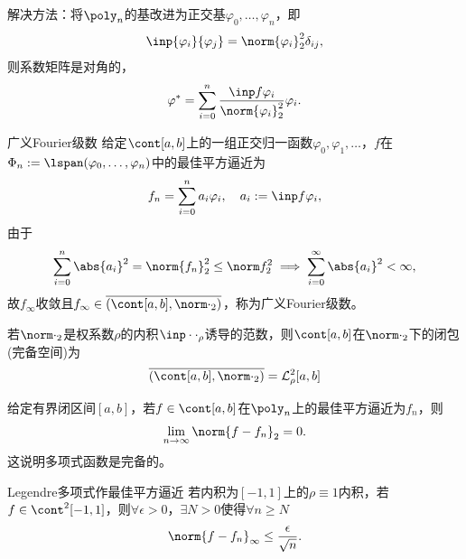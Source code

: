 \begin{remark}
    解决方法：将$\poly_n$的基改进为正交基$\varphi_0,\ldots,\varphi_n$，即
    \[
        \inp{\varphi_i}{\varphi_j}=\norm{\varphi_i}_2^2\delta_{ij},
    \]
    则系数矩阵是对角的，
    \begin{equation}
        \varphi^*=\sum_{i=0}^n\frac{\inp f{\varphi_i}}{\norm{\varphi_i}_2^2}\varphi_i.
    \end{equation}
\end{remark}

\begin{definition}
    {广义Fourier级数}{}
    给定$\cont[a,b]$上的一组正交归一函数$\varphi_0,\varphi_1,\ldots$，$f$在$\Phi_n:=\lspan(\varphi_0,\ldots,\varphi_n)$中的最佳平方逼近为
    \[
        f_n=\sum_{i=0}^na_i\varphi_i,\quad a_i:=\inp f{\varphi_i},
    \]
    由于
    \[
        \sum_{i=0}^n\abs{a_i}^2=\norm{f_n}_2^2\leq\norm f_2^2\implies\sum_{i=0}^\infty\abs{a_i}^2<\infty,
    \]
    故$f_\infty$收敛且$f_\infty\in\overline{(\cont[a,b],\norm\cdot_2)}$，称为广义Fourier级数。
\end{definition}

\begin{remark}
    若$\norm\cdot_2$是权系数$\rho$的内积$\inp\cdot\cdot_\rho$诱导的范数，则$\cont[a,b]$在$\norm\cdot_2$下的闭包(完备空间)为
    \begin{equation}
        \overline{(\cont[a,b],\norm\cdot_2)}=\mathcal L_\rho^2[a,b]
    \end{equation}
\end{remark}

\begin{theorem}
    {}{}
    给定有界闭区间$[a,b]$，若$f\in\cont[a,b]$在$\poly_n$上的最佳平方逼近为$f_n$，则
    \begin{equation}
        \lim_{n\to\infty}\norm{f-f_n}_2=0.
    \end{equation}
    这说明多项式函数是完备的。
\end{theorem}


\begin{theorem}
    {Legendre多项式作最佳平方逼近}{}
    若内积为$[-1,1]$上的$\rho\equiv 1$内积，若$f\in\cont^2[-1,1]$，则$\forall\epsilon>0$，$\exists N>0$使得$\forall n\geq N$
    \begin{equation}
        \norm{f-f_n}_\infty\leq\frac{\epsilon}{\sqrt n}.
    \end{equation}
\end{theorem}

